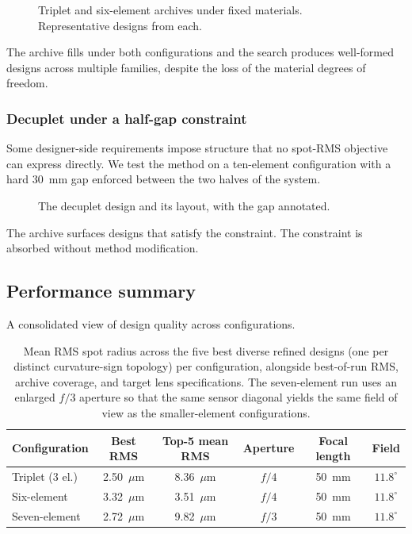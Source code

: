 \begin{figure}[h]
    \centering
    \caption{Triplet and six-element archives under fixed materials. Representative designs from each.}
    \label{fig:fixed-materials}
\end{figure}

The archive fills under both configurations and the search produces well-formed designs across multiple families, despite the loss of the material degrees of freedom.

\subsubsection{Decuplet under a half-gap constraint}

Some designer-side requirements impose structure that no spot-RMS objective can express directly. We test the method on a ten-element configuration with a hard 30~mm gap enforced between the two halves of the system.

\begin{figure}[h]
    \centering
    \caption{The decuplet design and its layout, with the gap annotated.}
    \label{fig:decuplet}
\end{figure}

The archive surfaces designs that satisfy the constraint. The constraint is absorbed without method modification.

\subsection{Performance summary}
\label{sec:results-summary}

A consolidated view of design quality across configurations.

\begin{table}[h]
    \centering
    \caption{Mean RMS spot radius across the five best diverse refined designs (one per distinct curvature-sign topology) per configuration, alongside best-of-run RMS, archive coverage, and target lens specifications. The seven-element run uses an enlarged $f/3$ aperture so that the same sensor diagonal yields the same field of view as the smaller-element configurations.}
    \label{tab:performance-summary}
    \begin{tabular}{lccccc}
        \toprule
        Configuration & Best RMS & Top-5 mean RMS & Aperture & Focal length & Field \\
        \midrule
        Triplet (3 el.)        & 2.50~$\mu$m & 8.36~$\mu$m & $f/4$ & 50~mm & $11.8^{\circ}$ \\
        Six-element            & 3.32~$\mu$m & 3.51~$\mu$m & $f/4$ & 50~mm & $11.8^{\circ}$ \\
        Seven-element          & 2.72~$\mu$m & 9.82~$\mu$m & $f/3$ & 50~mm & $11.8^{\circ}$ \\
        \bottomrule
    \end{tabular}
\end{table}

